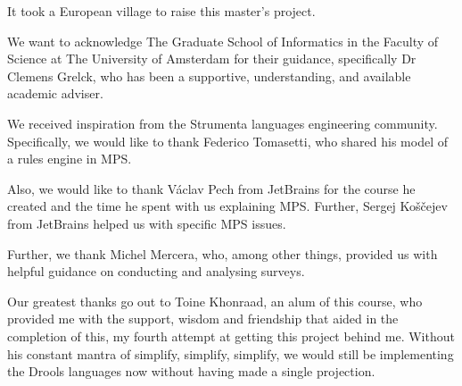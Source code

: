 \begin{acknowledgements}
\addchaptertocentry{\acknowledgementname}
It took a European village to raise this master's project.


We want to acknowledge The Graduate School of Informatics in the Faculty of Science at The University of Amsterdam for their guidance, specifically Dr Clemens Grelck, who has been a supportive, understanding, and available academic adviser.


We received inspiration from the Strumenta languages engineering community.
Specifically, we would like to thank Federico Tomasetti, who shared his model of a rules engine in MPS.


Also, we would like to thank Václav Pech from JetBrains for the course he created and the time he spent with us explaining MPS.
Further, Sergej Koščejev from JetBrains helped us with specific MPS issues.


Further, we thank Michel Mercera, who, among other things, provided us with helpful guidance on conducting and analysing surveys.


Our greatest thanks go out to Toine Khonraad, an alum of this course, who provided me with the support, wisdom and friendship that aided in the completion of this, my fourth attempt at getting this project behind me.
Without his constant mantra of simplify, simplify, simplify, we would still be implementing the Drools languages now without having made a single projection.
\end{acknowledgements}